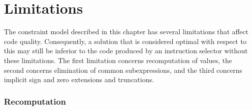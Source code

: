 \section{Limitations}

The \gls{constraint model} described in this chapter has several limitations
that affect code quality.
%
Consequently, a \gls{solution} that is considered optimal with respect to this
 may still be inferior to the code produced by an
\gls{instruction selector} without these limitations.
%
The first limitation concerns \gls{recomputation} of values, the second concerns
elimination of common subexpressions, and the third concerns implicit sign and
zero extensions and truncations.


\subsubsection{Recomputation}

